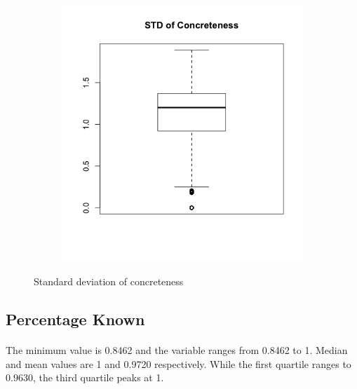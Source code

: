 \documentclass[11pt,a4paper]{article}
\begin{document}
\begin{figure}[H]
\begin{subfigure}[b]{0.4\linewidth}
  \end{subfigure}
  \begin{subfigure}[b]{0.4\linewidth}
    \includegraphics[width=\linewidth]{images/box_conc_std.png}
  \end{subfigure}
  \caption{Standard deviation of concreteness}
  \label{fig:concsd}
\end{figure}



\subsection{Percentage Known}
\paragraph{}
The minimum value is 0.8462 and the variable ranges from 0.8462 to 1. Median and mean values are 1 and 0.9720 respectively. While the first quartile ranges to 0.9630, the third quartile peaks at 1.
\end{document}
